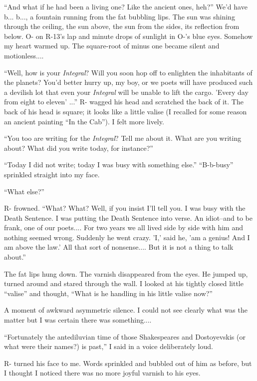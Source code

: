 \documentclass[11pt,openany]{book}
\begin{document}
``And what if he had been a living one? Like the ancient ones, heh?'' We'd have b... b..., a fountain running from the fat bubbling lips. The sun was shining through the ceiling, the sun above, the sun from the sides, its reflection from below. O- on R-13's lap and minute drops of sunlight in O-'s blue eyes. Somehow my heart warmed up. The square-root of minus one became silent and motionless....

``Well, how is your \emph{Integral}? Will you soon hop off to enlighten the inhabitants of the planets? You'd better hurry up, my boy, or we poets will have produced such a devilish lot that even your \emph{Integral} will be unable to lift the cargo. 'Every day from eight to eleven' ...'' R- wagged his head and scratched the back of it. The back of his head is square; it looks like a little valise (I recalled for some reason an ancient painting ``In the Cab''). I felt more lively.

``You too are writing for the \emph{Integral}? Tell me about it. What are you writing about? What did you write today, for instance?''

``Today I did not write; today I was busy with something else.'' ``B-b-busy'' sprinkled straight into my face.

``What else?''

R- frowned. ``What? What? Well, if you insist I'll tell you. I was busy with the Death Sentence. I was putting the Death Sentence into verse. An idiot--and to be frank, one of our poets.... For two years we all lived side by side with him and nothing seemed wrong. Suddenly he went crazy. 'I,' said he, 'am a genius! And I am above the law.' All that sort of nonsense.... But it is not a thing to talk about.''

The fat lips hung down. The varnish disappeared from the eyes. He jumped up, turned around and stared through the wall. I looked at his tightly closed little ``valise'' and thought, ``What is he handling in his little valise now?''

A moment of awkward asymmetric silence. I could not see clearly what was the matter but I was certain there was something....

``Fortunately the antediluvian time of those Shakespeares and Dostoyevskis (or what were their names?) is past,'' I said in a voice deliberately loud.

R- turned his face to me. Words sprinkled and bubbled out of him as before, but I thought I noticed there was no more joyful varnish to his eyes.
\end{document}
